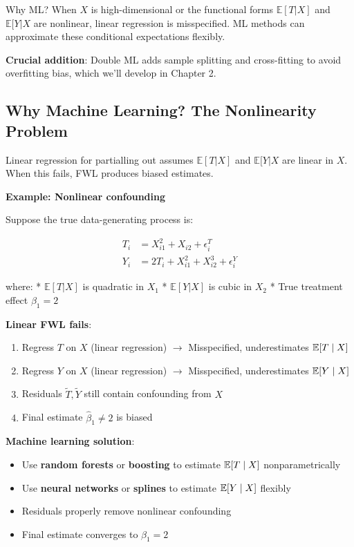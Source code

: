 Why ML? When \(X\) is high-dimensional or the functional forms
\(\mathbb{E}[T|X]\) and \(\mathbb{E}[Y|X\) are nonlinear, linear
regression is misspecified. ML methods can approximate these conditional
expectations flexibly.

\textbf{Crucial addition}: Double ML adds sample splitting and
cross-fitting to avoid overfitting bias, which we'll develop in Chapter
2.

\subsection{Why Machine Learning? The Nonlinearity
Problem}\label{_why_machine_learning_the_nonlinearity_problem}

Linear regression for partialling out assumes \(\mathbb{E}[T|X]\) and
\(\mathbb{E}[Y|X\) are linear in \(X\). When this fails, FWL produces
biased estimates.

\textbf{Example: Nonlinear confounding}

Suppose the true data-generating process is:

\begin{align}
T_i &= X_{i1}^2 + X_{i2} + \epsilon_i^T \\
Y_i &= 2 T_i + X_{i1}^2 + X_{i2}^3 + \epsilon_i^Y
\end{align}

where: * \(\mathbb{E}[T|X]\) is quadratic in \(X_1\) *
\(\mathbb{E}[Y|X]\) is cubic in \(X_2\) * True treatment effect
\(\beta_1 = 2\)

\textbf{Linear FWL fails}:
\begin{enumerate}
\item Regress $T$ on $X$ (linear regression) $\to$ Misspecified, underestimates $\mathbb{E}[T \mid X]$
\item Regress $Y$ on $X$ (linear regression) $\to$ Misspecified, underestimates $\mathbb{E}[Y \mid X]$
\item Residuals $\tilde{T}, \tilde{Y}$ still contain confounding from $X$
\item Final estimate $\hat{\beta}_1 \neq 2$ is biased
\end{enumerate}

\textbf{Machine learning solution}:
\begin{itemize}
\item Use \textbf{random forests} or \textbf{boosting} to estimate $\mathbb{E}[T \mid X]$ nonparametrically
\item Use \textbf{neural networks} or \textbf{splines} to estimate $\mathbb{E}[Y \mid X]$ flexibly
\item Residuals properly remove nonlinear confounding
\item Final estimate converges to $\beta_1 = 2$
\end{itemize}

